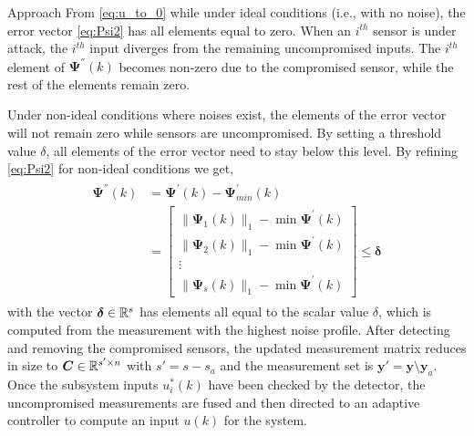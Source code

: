 \begin{section}{Approach}
From \eqref{eq:u_to_0} while under ideal conditions (i.e., with no noise), the error vector \eqref{eq:Psi2} has all elements equal to zero. When an $i^{th}$ sensor is under attack, the $i^{th}$ input diverges from the remaining uncompromised inputs. The $i^{th}$ element of $\bm{\Psi}^{''}(k)$ becomes non-zero due to the compromised sensor, while the rest of the elements remain zero. 

Under non-ideal conditions where noises exist, the elements of the error vector will not remain zero while sensors are uncompromised. By setting a threshold value $\delta$, all elements of the error vector need to stay below this level. By refining \eqref{eq:Psi2} for non-ideal conditions we get,
    \begin{align}
    \begin{split}
    \label{eq:Psi2_nonideal}
	\bm{\Psi^{''}}(k)&=\bm{\Psi^{'}}(k)-\bm{\Psi}^{'}_{min}(k) \\
	& =\begin{bmatrix} \lVert{\bm{\Psi}_1(k)}\rVert_1 - \min \bm{\Psi}^{'}(k)\\ \lVert{\bm{\Psi}_2(k)}\rVert_1 - \min \bm{\Psi}^{'}(k) \\ \vdots \\ \lVert{\bm{\Psi}_s(k)}\rVert_1 - \min \bm{\Psi}^{'}(k) \end{bmatrix} \leq \bm{\delta}
	\end{split}
	\end{align}
with the vector $\bm{\delta} \in \mathbb{R}^s$ has elements all equal to the scalar value $\delta$, which is computed from the measurement with the highest noise profile. After detecting and removing the compromised sensors, the updated measurement matrix reduces in size to $\bm{C} \in \mathbb{R}^{s' \times n}$ with $s'=s-s_a$ and the measurement set is $\bm{y}' =\bm{y}\setminus\bm{y}_a$. Once the subsystem inputs $u_i^*(k)$ have been checked by the detector, the uncompromised measurements are fused and then directed to an adaptive controller to compute an input $u(k)$ for the system.


	


\end{section}
